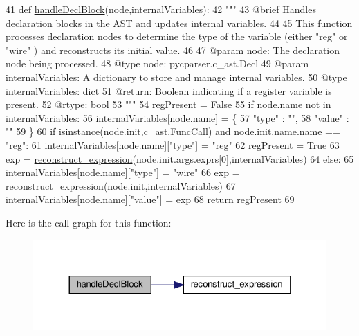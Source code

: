 \begin{DoxyCode}
41 \textcolor{keyword}{def }\hyperlink{namespaceblockHandlers_ad92852be9f2eee24eb76b2dd747e7584}{handleDeclBlock}(node,internalVariables):
42     \textcolor{stringliteral}{"""
}
43 \textcolor{stringliteral}{    @brief Handles declaration blocks in the AST and updates internal variables.
}
44 \textcolor{stringliteral}{
}
45 \textcolor{stringliteral}{    This function processes declaration nodes to determine the type of the variable (either "reg" or "wire"
      ) and reconstructs its initial value.
}
46 \textcolor{stringliteral}{
}
47 \textcolor{stringliteral}{    @param node: The declaration node being processed.
}
48 \textcolor{stringliteral}{    @type node: pycparser.c\_ast.Decl
}
49 \textcolor{stringliteral}{    @param internalVariables: A dictionary to store and manage internal variables.
}
50 \textcolor{stringliteral}{    @type internalVariables: dict
}
51 \textcolor{stringliteral}{    @return: Boolean indicating if a register variable is present.
}
52 \textcolor{stringliteral}{    @rtype: bool
}
53 \textcolor{stringliteral}{    """}
54     regPresent = \textcolor{keyword}{False}
55     \textcolor{keywordflow}{if} node.name \textcolor{keywordflow}{not} \textcolor{keywordflow}{in} internalVariables:
56         internalVariables[node.name] = \{
57             \textcolor{stringliteral}{"type"} : \textcolor{stringliteral}{""},
58             \textcolor{stringliteral}{"value"} : \textcolor{stringliteral}{""}
59         \}
60     \textcolor{keywordflow}{if} isinstance(node.init,c\_ast.FuncCall) \textcolor{keywordflow}{and} node.init.name.name == \textcolor{stringliteral}{"reg"}:
61         internalVariables[node.name][\textcolor{stringliteral}{"type"}] = \textcolor{stringliteral}{"reg"}
62         regPresent = \textcolor{keyword}{True}
63         exp = \hyperlink{namespaceblockHandlers_a5dcb5985c58176982a44686f616daa7f}{reconstruct\_expression}(node.init.args.exprs[0],internalVariables)
64     \textcolor{keywordflow}{else}:
65         internalVariables[node.name][\textcolor{stringliteral}{"type"}] = \textcolor{stringliteral}{"wire"}
66         exp = \hyperlink{namespaceblockHandlers_a5dcb5985c58176982a44686f616daa7f}{reconstruct\_expression}(node.init,internalVariables)
67     internalVariables[node.name][\textcolor{stringliteral}{"value"}] = exp
68     \textcolor{keywordflow}{return} regPresent
69 
\end{DoxyCode}
Here is the call graph for this function\+:\nopagebreak
\begin{figure}[H]
\begin{center}
\leavevmode
\includegraphics[width=324pt]{namespaceblockHandlers_ad92852be9f2eee24eb76b2dd747e7584_cgraph}
\end{center}
\end{figure}
